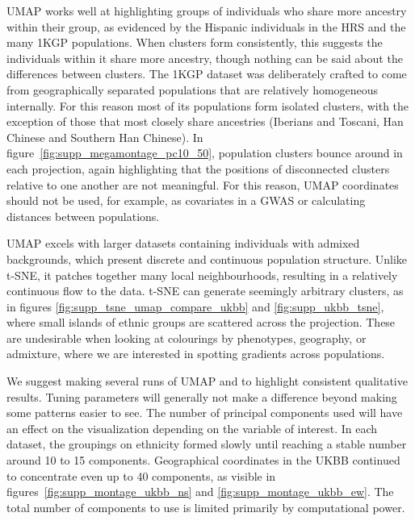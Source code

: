 \documentclass[12pt]{pnas-new}
\begin{document}
UMAP works well at highlighting groups of individuals who share more ancestry within their group, as evidenced by the Hispanic individuals in the HRS and the many 1KGP populations. When clusters form consistently, this suggests the individuals within it share more ancestry, though nothing can be said about the differences between clusters. The 1KGP dataset was deliberately crafted to come from geographically separated populations that are relatively homogeneous internally. For this reason most of its populations form isolated clusters, with the exception of those that most closely share ancestries (Iberians and Toscani, Han Chinese and Southern Han Chinese). In figure~\ref{fig:supp_megamontage_pc10_50}, population clusters bounce around in each projection, again highlighting that the positions of disconnected clusters relative to one another are not meaningful. For this reason, UMAP coordinates should not be used, for example, as covariates in a GWAS or calculating distances between populations.

UMAP excels with larger datasets containing individuals with admixed backgrounds, which present discrete and continuous population structure. Unlike t-SNE, it patches together many local neighbourhoods, resulting in a relatively continuous flow to the data. t-SNE can generate seemingly arbitrary clusters, as in figures \ref{fig:supp_tsne_umap_compare_ukbb} and \ref{fig:supp_ukbb_tsne}, where small islands of ethnic groups are scattered across the projection. These are undesirable when looking at colourings by phenotypes, geography, or admixture, where we are interested in spotting gradients across populations.

We suggest making several runs of UMAP and to highlight consistent qualitative results. Tuning parameters will generally not make a difference beyond making some patterns easier to see. The number of principal components used will have an effect on the visualization depending on the variable of interest. In each dataset, the groupings on ethnicity formed slowly until reaching a stable number around 10 to 15 components. Geographical coordinates in the UKBB continued to concentrate even up to 40 components, as visible in figures~\ref{fig:supp_montage_ukbb_ns} and \ref{fig:supp_montage_ukbb_ew}. The total number of components to use is limited primarily by computational power.
\end{document}
